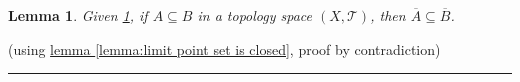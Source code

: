 \documentclass[12pt]{article}
\numberwithin{equation}{section}
\theoremstyle{plain} %
\newtheorem{lemma}[equation]{Lemma}
\theoremstyle{definition}
\theoremstyle{remark}
\newenvironment{proof}{{\bf Proof:}}{\hfill\rule{2mm}{2mm}}
\begin{document}
\begin{lemma}
Given \hyperref[definition:closure 1]{1}, if $A \subseteq B$ in a topology space $(X, \mathcal{T})$, then $\overline{A} \subseteq \overline{B}$. \label{lemma:topological closure of subset is subset of topological closure} \label{lemma:topological closure of subset is subset of topological closure}
\end{lemma}

\begin{proof}
(using \hyperref[lemma:limit point set is closed]{lemma \ref*{lemma:limit point set is closed}}, proof by contradiction)
\end{proof}

%


%  	
%
%

%

\end{document}
